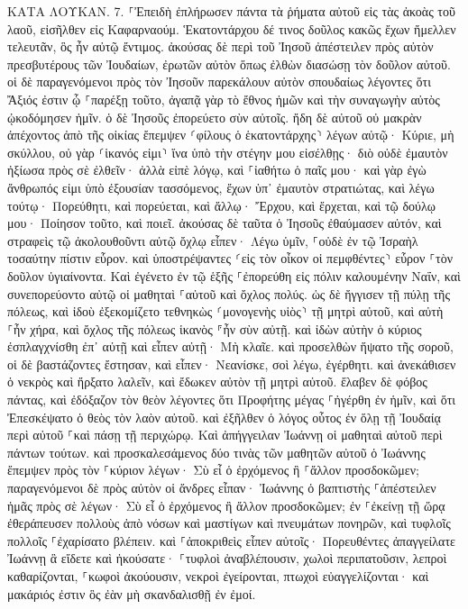 \documentclass[twoside, 9pt]{extreport}
\begin{document}
ΚΑΤΑ ΛΟΥΚΑΝ.
7.
⸀Ἐπειδὴ ἐπλήρωσεν πάντα τὰ ῥήματα αὐτοῦ εἰς τὰς ἀκοὰς τοῦ λαοῦ, εἰσῆλθεν εἰς Καφαρναούμ. 
Ἑκατοντάρχου δέ τινος δοῦλος κακῶς ἔχων ἤμελλεν τελευτᾶν, ὃς ἦν αὐτῷ ἔντιμος. 
ἀκούσας δὲ περὶ τοῦ Ἰησοῦ ἀπέστειλεν πρὸς αὐτὸν πρεσβυτέρους τῶν Ἰουδαίων, ἐρωτῶν αὐτὸν ὅπως ἐλθὼν διασώσῃ τὸν δοῦλον αὐτοῦ. 
οἱ δὲ παραγενόμενοι πρὸς τὸν Ἰησοῦν παρεκάλουν αὐτὸν σπουδαίως λέγοντες ὅτι Ἄξιός ἐστιν ᾧ ⸀παρέξῃ τοῦτο, 
ἀγαπᾷ γὰρ τὸ ἔθνος ἡμῶν καὶ τὴν συναγωγὴν αὐτὸς ᾠκοδόμησεν ἡμῖν. 
ὁ δὲ Ἰησοῦς ἐπορεύετο σὺν αὐτοῖς. ἤδη δὲ αὐτοῦ οὐ μακρὰν ἀπέχοντος ἀπὸ τῆς οἰκίας ἔπεμψεν ⸂φίλους ὁ ἑκατοντάρχης⸃ λέγων αὐτῷ· Κύριε, μὴ σκύλλου, οὐ γὰρ ⸂ἱκανός εἰμι⸃ ἵνα ὑπὸ τὴν στέγην μου εἰσέλθῃς· 
διὸ οὐδὲ ἐμαυτὸν ἠξίωσα πρὸς σὲ ἐλθεῖν· ἀλλὰ εἰπὲ λόγῳ, καὶ ⸀ἰαθήτω ὁ παῖς μου· 
καὶ γὰρ ἐγὼ ἄνθρωπός εἰμι ὑπὸ ἐξουσίαν τασσόμενος, ἔχων ὑπ᾽ ἐμαυτὸν στρατιώτας, καὶ λέγω τούτῳ· Πορεύθητι, καὶ πορεύεται, καὶ ἄλλῳ· Ἔρχου, καὶ ἔρχεται, καὶ τῷ δούλῳ μου· Ποίησον τοῦτο, καὶ ποιεῖ. 
ἀκούσας δὲ ταῦτα ὁ Ἰησοῦς ἐθαύμασεν αὐτόν, καὶ στραφεὶς τῷ ἀκολουθοῦντι αὐτῷ ὄχλῳ εἶπεν· Λέγω ὑμῖν, ⸀οὐδὲ ἐν τῷ Ἰσραὴλ τοσαύτην πίστιν εὗρον. 
καὶ ὑποστρέψαντες ⸂εἰς τὸν οἶκον οἱ πεμφθέντες⸃ εὗρον ⸀τὸν δοῦλον ὑγιαίνοντα. 
Καὶ ἐγένετο ἐν τῷ ἑξῆς ⸀ἐπορεύθη εἰς πόλιν καλουμένην Ναΐν, καὶ συνεπορεύοντο αὐτῷ οἱ μαθηταὶ ⸀αὐτοῦ καὶ ὄχλος πολύς. 
ὡς δὲ ἤγγισεν τῇ πύλῃ τῆς πόλεως, καὶ ἰδοὺ ἐξεκομίζετο τεθνηκὼς ⸂μονογενὴς υἱὸς⸃ τῇ μητρὶ αὐτοῦ, καὶ αὐτὴ ⸀ἦν χήρα, καὶ ὄχλος τῆς πόλεως ἱκανὸς ⸁ἦν σὺν αὐτῇ. 
καὶ ἰδὼν αὐτὴν ὁ κύριος ἐσπλαγχνίσθη ἐπ᾽ αὐτῇ καὶ εἶπεν αὐτῇ· Μὴ κλαῖε. 
καὶ προσελθὼν ἥψατο τῆς σοροῦ, οἱ δὲ βαστάζοντες ἔστησαν, καὶ εἶπεν· Νεανίσκε, σοὶ λέγω, ἐγέρθητι. 
καὶ ἀνεκάθισεν ὁ νεκρὸς καὶ ἤρξατο λαλεῖν, καὶ ἔδωκεν αὐτὸν τῇ μητρὶ αὐτοῦ. 
ἔλαβεν δὲ φόβος πάντας, καὶ ἐδόξαζον τὸν θεὸν λέγοντες ὅτι Προφήτης μέγας ⸀ἠγέρθη ἐν ἡμῖν, καὶ ὅτι Ἐπεσκέψατο ὁ θεὸς τὸν λαὸν αὐτοῦ. 
καὶ ἐξῆλθεν ὁ λόγος οὗτος ἐν ὅλῃ τῇ Ἰουδαίᾳ περὶ αὐτοῦ ⸀καὶ πάσῃ τῇ περιχώρῳ. 
Καὶ ἀπήγγειλαν Ἰωάννῃ οἱ μαθηταὶ αὐτοῦ περὶ πάντων τούτων. καὶ προσκαλεσάμενος δύο τινὰς τῶν μαθητῶν αὐτοῦ ὁ Ἰωάννης 
ἔπεμψεν πρὸς τὸν ⸀κύριον λέγων· Σὺ εἶ ὁ ἐρχόμενος ἢ ⸀ἄλλον προσδοκῶμεν; 
παραγενόμενοι δὲ πρὸς αὐτὸν οἱ ἄνδρες εἶπαν· Ἰωάννης ὁ βαπτιστὴς ⸀ἀπέστειλεν ἡμᾶς πρὸς σὲ λέγων· Σὺ εἶ ὁ ἐρχόμενος ἢ ἄλλον προσδοκῶμεν; 
ἐν ⸀ἐκείνῃ τῇ ὥρᾳ ἐθεράπευσεν πολλοὺς ἀπὸ νόσων καὶ μαστίγων καὶ πνευμάτων πονηρῶν, καὶ τυφλοῖς πολλοῖς ⸀ἐχαρίσατο βλέπειν. 
καὶ ⸀ἀποκριθεὶς εἶπεν αὐτοῖς· Πορευθέντες ἀπαγγείλατε Ἰωάννῃ ἃ εἴδετε καὶ ἠκούσατε· ⸀τυφλοὶ ἀναβλέπουσιν, χωλοὶ περιπατοῦσιν, λεπροὶ καθαρίζονται, ⸀κωφοὶ ἀκούουσιν, νεκροὶ ἐγείρονται, πτωχοὶ εὐαγγελίζονται· 
καὶ μακάριός ἐστιν ὃς ἐὰν μὴ σκανδαλισθῇ ἐν ἐμοί. 
\end{document}
